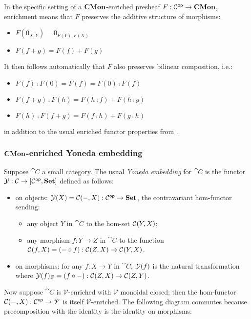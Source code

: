 In the specific setting of a $\mathbf{CMon}$-enriched presheaf $F: \mathcal{C}^{\mathsf{op}} \to \mathbf{CMon}$, enrichment means that $F$
preserves the additive structure of morphisms:
\begin{itemize}
\item $F(0_{X,Y}) = 0_{F(Y),F(X)}$
\item $F(f + g) = F(f) + F(g)$
\end{itemize}
It then follows automatically that $F$ also preserves bilinear composition, i.e.:
\begin{itemize}
\item $F(f) \comp F(0) = F(f) = F(0) \comp F(f)$
\item $F(f + g) \comp F(h) = F(h \comp f) + F(h \comp g)$
\item $F(h) \comp F(f + g) = F(f \comp h) + F(g \comp h)$
\end{itemize}
in addition to the usual enriched functor properties from .

\subsubsection{$\mathbf{CMon}$-enriched Yoneda embedding}

Suppose $\cat{C}$ a small category. The usual \emph{Yoneda embedding} for $\cat{C}$ is the functor $\mathcal{Y}:
\mathcal{C} \to [\mathcal{C}^{\mathsf{op}},\mathbf{Set}]$ defined as follows:
\begin{itemize}
\item on objects: $\mathcal{Y}(X) = {\mathcal{C}}(-,X): \mathcal{C}^{\mathsf{op}} \to \mathbf{Set}$, the contravariant hom-functor
sending:
   \begin{itemize}
   \item any object $Y$ in $\cat{C}$ to the hom-set ${\mathcal{C}}(Y,X)$;
   \item any morphism $f: Y \to Z$ in $\cat{C}$ to the function ${\mathcal{C}}(f,X) = (- \circ f):
   {\mathcal{C}}(Z,X) \to {\mathcal{C}}(Y,X)$.
   \end{itemize}
\item on morphisms: for any $f: X \to Y$ in $\cat{C}$, $\mathcal{Y}(f)$ is the natural transformation where
$\mathcal{Y}(f)_Z = (f \circ -): {\mathcal{C}}(Z,X) \to {\mathcal{C}}(Z,Y)$.
\end{itemize}

\noindent Now suppose $\cat{C}$ is $\mathscr{V}$-enriched with $\mathscr{V}$ monoidal closed; then the
hom-functor ${\mathcal{C}}(-,X): \mathcal{C}^{\mathsf{op}} \to \mathscr{V}$ is itself $\mathscr{V}$-enriched. The following
diagram commutes because precomposition with the identity is the identity on morphisms:

